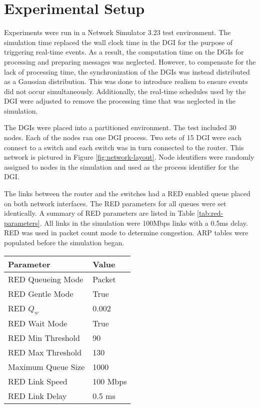 
\section{Experimental Setup}

Experiments were run in a Network Simulator 3.23\cite{NS3} test environment.
The simulation time replaced the wall clock time in the \ac{DGI} for the purpose of triggering real-time events.
As a result, the computation time on the \ac{DGI}s for processing and preparing messages was neglected.
However, to compensate for the lack of processing time, the synchronization of the \ac{DGI}s was instead distributed as a Gaussian distribution.
This was done to introduce realism to ensure events did not occur simultaneously.
Additionally, the real-time schedules used by the \ac{DGI} were adjusted to remove the processing time that was neglected in the simulation.

The \ac{DGI}s were placed into a partitioned environment.
The test included 30 nodes.
Each of the nodes ran one \ac{DGI} process.
Two sets of 15 \ac{DGI} were each connect to a switch and each switch was in turn connected to the router.
This network is pictured in Figure \ref{fig:network-layout}.
Node identifiers were randomly assigned to nodes in the simulation and used as the process identifier for the \ac{DGI}.

The links between the router and the switches had a \ac{RED} enabled queue placed on both network interfaces.
The \ac{RED} parameters for all queues were set identically.
A summary of \ac{RED} parameters are listed in Table \ref{tab:red-parameters}.
All links in the simulation were 100Mbps links with a 0.5ms delay.
RED was used in packet count mode to determine congestion.
ARP tables were populated before the simulation began.

\begin{table*}
\begin{tabular}{ | l | l | } \hline
Parameter & Value         \\ \hline
RED Queueing Mode & Packet\\ \hline 
RED Gentle Mode & True    \\ \hline
RED $Q_{w}$ & 0.002       \\ \hline
RED Wait Mode & True      \\ \hline
RED Min Threshold & 90    \\ \hline
RED Max Threshold & 130   \\ \hline
Maximum Queue Size & 1000 \\ \hline
RED Link Speed & 100 Mbps \\ \hline
RED Link Delay & 0.5 ms   \\ \hline
\end{tabular}
\caption{Summary of \ac{RED} parameters. Unspecified values default to the \ac{NS3} implementation default value}
\label{tab:red-parameters}
\end{table*}

